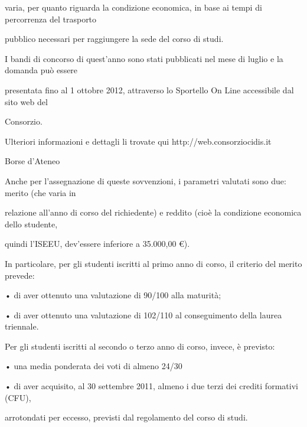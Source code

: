 varia, per quanto riguarda la condizione economica, in base ai tempi di percorrenza del trasporto 



pubblico necessari per raggiungere la sede del corso di studi. 



I bandi di concorso di quest'anno sono stati pubblicati nel mese di luglio e la domanda può essere 



presentata fino al 1 ottobre 2012, attraverso lo Sportello On Line accessibile dal sito web del 



Consorzio. 



Ulteriori informazioni e dettagli li trovate qui http://web.consorziocidis.it



Borse d'Ateneo



Anche per l'assegnazione di queste sovvenzioni, i parametri valutati sono due: merito (che varia in 



relazione all'anno di corso del richiedente) e reddito (cioè la condizione economica dello studente, 



quindi l'ISEEU, dev'essere inferiore a 35.000,00 €). 



In particolare, per gli studenti iscritti al primo anno di corso, il criterio del merito prevede: 



• di aver ottenuto una valutazione di 90/100 alla maturità; 



• di aver ottenuto una valutazione di 102/110 al conseguimento della laurea triennale. 



 Per gli studenti iscritti al secondo o terzo anno di corso, invece, è previsto: 



• una media ponderata dei voti di almeno 24/30 



• di  aver acquisito, al 30 settembre 2011, almeno i  due terzi dei crediti formativi (CFU), 



arrotondati per eccesso, previsti dal regolamento del corso di studi. 



